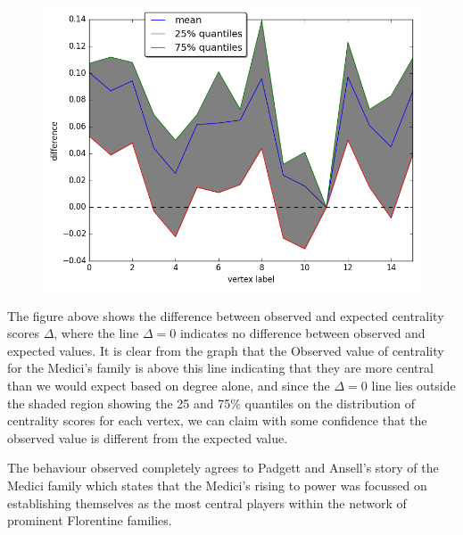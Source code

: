 \documentclass{article}
\begin{document}
\begin{itemize}
\begin{figure}[!h]
  \centering
  \begin{minipage}[b]{0.5\textwidth}
    \includegraphics[width=\textwidth]{images/5b.png}
  \end{minipage}
\end{figure}

The figure above shows the difference between observed and expected centrality scores $\Delta$, where the line $\Delta = 0$ indicates no difference between observed and expected values. It is clear from the graph that the Observed value of centrality for the Medici's family is above this line indicating that they are more central than we would expect based on degree alone, and since the $\Delta = 0$ line lies outside the shaded region showing the 25 and 75\% quantiles on the distribution of centrality scores for each vertex, we can claim with some confidence that the observed value is different from the expected value. 

The behaviour observed completely agrees to Padgett and Ansell's story of the Medici family which states that the Medici's rising to power was focussed on establishing themselves as the most central players within the network of prominent Florentine families. 
\end{itemize}
\end{document}
